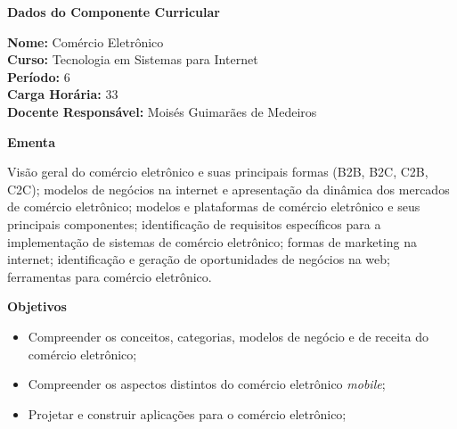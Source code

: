

\begin{snugshade}\begin{center}\textbf{
    Dados do Componente Curricular
}\end{center}\end{snugshade}

\noindent \textbf{Nome:}                Comércio Eletrônico
\\        \textbf{Curso:}               Tecnologia em Sistemas para Internet
\\        \textbf{Período:}             \unit{6}{\degree}
\\        \textbf{Carga Horária:}       \unit{33}{\hour}
\\        \textbf{Docente Responsável:} Moisés Guimarães de Medeiros


\begin{snugshade}\begin{center}\textbf{
    Ementa
\vphantom{q}}\end{center}\end{snugshade}

\noindent
Visão geral do comércio eletrônico e suas principais formas (B2B, B2C, C2B, C2C); modelos de negócios na internet e apresentação da dinâmica dos mercados de comércio eletrônico; modelos e plataformas de comércio eletrônico e seus principais componentes; identificação de requisitos específicos para a implementação de sistemas de comércio eletrônico; formas de marketing na internet; identificação e geração de oportunidades de negócios na web; ferramentas para comércio eletrônico.


\begin{snugshade}\begin{center}\textbf{
    Objetivos
}\end{center}\end{snugshade}

\begin{itemize}

\item Compreender os conceitos, categorias, modelos de negócio e de receita do comércio eletrônico;

\item Compreender os aspectos distintos do comércio eletrônico \textit{mobile};

\item Projetar e construir aplicações para o comércio eletrônico;

\end{itemize}

